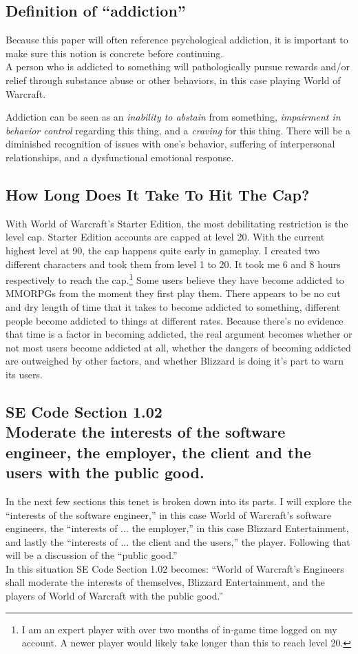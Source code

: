 \documentclass[11pt]{article}
\begin{document}
\begin{multicols}{2}
\subsection{Definition of ``addiction''}
Because this paper will often reference psychological addiction, it is important to make sure this notion is concrete before continuing.\\
A person who is addicted to something will pathologically pursue rewards and/or relief through substance abuse or other behaviors, in this case playing World of Warcraft. \cite{DefinitionOfAddiction}

Addiction can be seen as an \emph{inability to abstain} from something, \emph{impairment in behavior control} regarding this thing, and a \emph{craving} for this thing. There will be a diminished recognition of issues with one's behavior, suffering of interpersonal relationships, and a dysfunctional emotional response. \cite{DefinitionOfAddiction}

\subsection{How Long Does It Take To Hit The Cap?}
With World of Warcraft's Starter Edition, the most debilitating restriction is the level cap. Starter Edition accounts are capped at level 20. \cite{StarterEditionFAQ} With the current highest level at 90, the cap happens quite early in gameplay. I created two different characters and took them from level 1 to 20. It took me 6 and 8 hours respectively to reach the cap.\footnote{I am an expert player with over two months of in-game time logged on my account. A newer player would likely take longer than this to reach level 20.}
Some users believe they have become addicted to MMORPGs from the moment they first play them. \cite{JustAComputerGameRight} There appears to be no cut and dry length of time that it takes to become addicted to something, different people become addicted to things at different rates.
Because there's no evidence that time is a factor in becoming addicted, the real argument becomes whether or not most users become addicted at all, whether the dangers of becoming addicted are outweighed by other factors, and whether Blizzard is doing it's part to warn its users.

\subsection{SE Code Section 1.02\\Moderate the interests of the software engineer, the employer, the client and the users with the public good.}
In the next few sections this tenet is broken down into its parts. I will explore the ``interests of the software engineer,'' in this case World of Warcraft's software engineers, the ``interests of ... the employer,'' in this case Blizzard Entertainment, and lastly the ``interests of ... the client and the users,'' the player. Following that will be a discussion of the ``public good.''\\
In this situation SE Code Section 1.02 becomes: ``World of Warcraft's Engineers shall moderate the interests of themselves, Blizzard Entertainment, and the players of World of Warcraft with the public good.''

\end{multicols}
\end{document}
